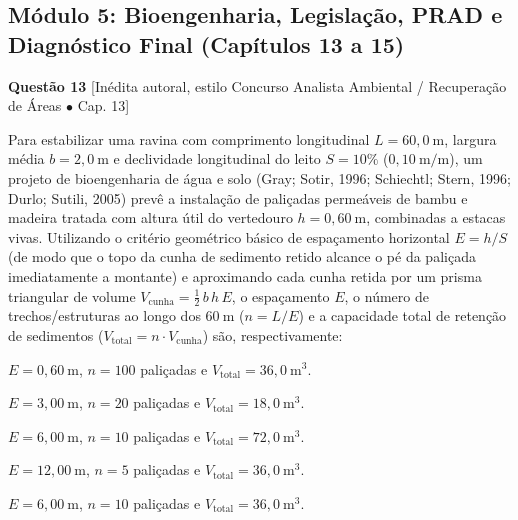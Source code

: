 \subsection*{Módulo 5: Bioengenharia, Legislação, PRAD e Diagnóstico Final (Capítulos 13 a 15)}

\noindent\textbf{Questão 13} {\footnotesize\color{uefsMuted}[Inédita autoral, estilo Concurso Analista Ambiental / Recuperação de Áreas $\bullet$ Cap. 13]}\par
Para estabilizar uma ravina com comprimento longitudinal $L = 60,0\ \text{m}$, largura média $b = 2,0\ \text{m}$ e declividade longitudinal do leito $S = 10\%$ ($0,10\ \text{m/m}$), um projeto de bioengenharia de água e solo (Gray; Sotir, 1996; Schiechtl; Stern, 1996; Durlo; Sutili, 2005) prevê a instalação de paliçadas permeáveis de bambu e madeira tratada com altura útil do vertedouro $h = 0,60\ \text{m}$, combinadas a estacas vivas. Utilizando o critério geométrico básico de espaçamento horizontal $E = h / S$ (de modo que o topo da cunha de sedimento retido alcance o pé da paliçada imediatamente a montante) e aproximando cada cunha retida por um prisma triangular de volume $V_{\text{cunha}} = \tfrac{1}{2}\,b\,h\,E$, o espaçamento $E$, o número de trechos/estruturas ao longo dos $60\ \text{m}$ ($n = L / E$) e a capacidade total de retenção de sedimentos ($V_{\text{total}} = n \cdot V_{\text{cunha}}$) são, respectivamente:
\begin{alternativas}
  \item $E = 0,60\ \text{m}$, $n = 100$ paliçadas e $V_{\text{total}} = 36,0\ \text{m}^3$.
  \item $E = 3,00\ \text{m}$, $n = 20$ paliçadas e $V_{\text{total}} = 18,0\ \text{m}^3$.
  \item $E = 6,00\ \text{m}$, $n = 10$ paliçadas e $V_{\text{total}} = 72,0\ \text{m}^3$.
  \item $E = 12,00\ \text{m}$, $n = 5$ paliçadas e $V_{\text{total}} = 36,0\ \text{m}^3$.
  \item $E = 6,00\ \text{m}$, $n = 10$ paliçadas e $V_{\text{total}} = 36,0\ \text{m}^3$.
\end{alternativas}

